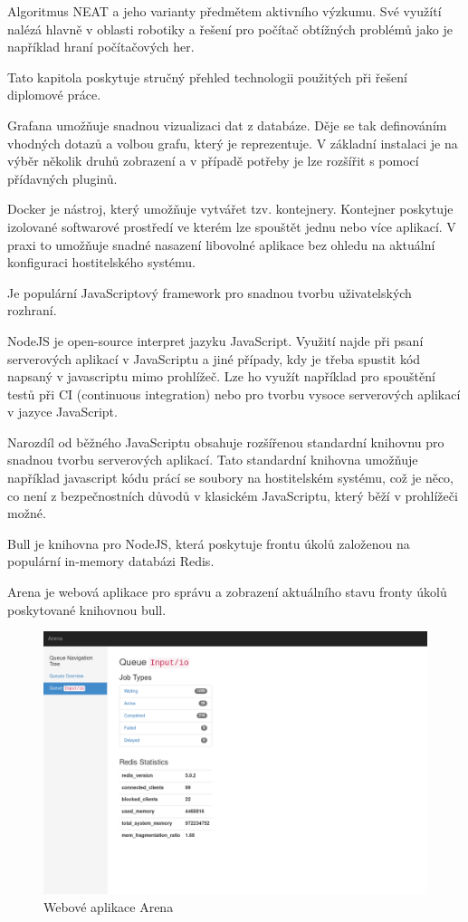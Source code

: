 Algoritmus NEAT a jeho varianty předmětem aktivního výzkumu. Své využítí nalézá hlavně v oblasti robotiky a řešení pro počítač obtížných problémů jako je například hraní počítačových her.
 
Tato kapitola poskytuje stručný přehled technologii použitých při řešení diplomové práce.

\label{sec:grafana}
Grafana umožňuje snadnou vizualizaci dat z databáze. Děje se tak definováním vhodných dotazů a volbou grafu, který je reprezentuje. V základní instalaci je na výběr několik druhů zobrazení a v případě potřeby je lze rozšířit s pomocí přídavných pluginů.

Docker je nástroj, který umožňuje vytvářet tzv. kontejnery. Kontejner poskytuje izolované softwarové prostředí ve kterém lze spouštět jednu nebo více aplikací. 
V praxi to umožňuje snadné nasazení libovolné aplikace bez ohledu na aktuální konfiguraci hostitelského systému.

Je populární JavaScriptový framework pro snadnou tvorbu uživatelských rozhraní.

NodeJS je open-source interpret jazyku JavaScript. Využití najde při psaní serverových aplikací v JavaScriptu a jiné případy, kdy je třeba spustit kód napsaný v javascriptu mimo prohlížeč. Lze ho využít například pro spouštění testů při CI (continuous integration) nebo pro tvorbu vysoce serverových aplikací v jazyce JavaScript.

Narozdíl od běžného JavaScriptu obsahuje rozšířenou standardní knihovnu pro snadnou tvorbu serverových aplikací. Tato standardní knihovna umožňuje například javascript kódu prácí se soubory na hostitelském systému, což je něco, co není z bezpečnostních důvodů v klasickém JavaScriptu, který běží v prohlížeči možné.

Bull je knihovna pro NodeJS, která poskytuje frontu úkolů založenou na populární in-memory databázi Redis.

Arena je webová aplikace pro správu a zobrazení aktuálního stavu fronty úkolů poskytované knihovnou bull.

\begin{figure}[H]
	\centering
	\includegraphics[width=0.7\linewidth]{bull}
	\caption{Webové aplikace Arena}
	\label{fig:bull}
\end{figure}

